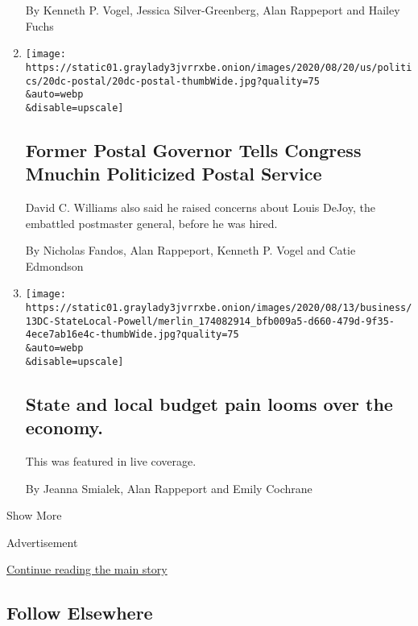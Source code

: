 \begin{enumerate}
  By Kenneth P. Vogel, Jessica Silver-Greenberg, Alan Rappeport and
  Hailey Fuchs
\item
  \href{/2020/08/20/us/politics/former-postal-governor-tells-congress-mnuchin-politicized-postal-service.html}{}

  \texttt{[image: https://static01.graylady3jvrrxbe.onion/images/2020/08/20/us/politics/20dc-postal/20dc-postal-thumbWide.jpg?quality=75\\\&auto=webp\\\&disable=upscale]}

  \hypertarget{former-postal-governor-tells-congress-mnuchin-politicized-postal-service}{%
  \subsection{Former Postal Governor Tells Congress Mnuchin Politicized
  Postal
  Service}\label{former-postal-governor-tells-congress-mnuchin-politicized-postal-service}}

  David C. Williams also said he raised concerns about Louis DeJoy, the
  embattled postmaster general, before he was hired.

  By Nicholas Fandos, Alan Rappeport, Kenneth P. Vogel and Catie
  Edmondson
\item
  \href{/live/2020/08/14/business/stock-market-today-coronavirus/state-and-local-budget-pain-looms-over-the-economy}{}

  \texttt{[image: https://static01.graylady3jvrrxbe.onion/images/2020/08/13/business/13DC-StateLocal-Powell/merlin\_174082914\_bfb009a5-d660-479d-9f35-4ece7ab16e4c-thumbWide.jpg?quality=75\\\&auto=webp\\\&disable=upscale]}

  \hypertarget{state-and-local-budget-pain-looms-over-the-economy}{%
  \subsection{State and local budget pain looms over the
  economy.}\label{state-and-local-budget-pain-looms-over-the-economy}}

  This was featured in live coverage.

  By Jeanna Smialek, Alan Rappeport and Emily Cochrane
\end{enumerate}

Show More

Advertisement

\protect\hyperlink{after-mid2}{Continue reading the main story}

\hypertarget{follow-elsewhere}{%
\subsection{Follow Elsewhere}\label{follow-elsewhere}}

